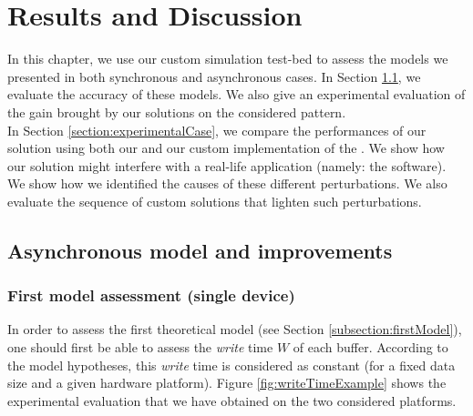 


\chapter{Results and Discussion}\label{chapter:results}
	In this chapter, we use our custom simulation test-bed to assess the models we presented in both synchronous and asynchronous cases.   In Section \ref{section:asynchronousModel}, we evaluate the accuracy of these models.   We also give an experimental evaluation of the gain brought by our solutions on the considered pattern.\\
	In Section \ref{section:experimentalCase}, we compare the performances of our \notationaio\space solution using both our \toolSimulationSoftware\space and our custom implementation of the \toolTargetSoftware.   We show how our solution might interfere with a real-life application (namely: the \toolTargetSoftware software).   We show how we identified the causes of these different perturbations.   We also evaluate the sequence of custom solutions that lighten such perturbations.\\


\section{Asynchronous model and improvements} \label{section:asynchronousModel}
	\subsection{First model assessment (single \notationIO\space device)}\label{subsection:AIO_firstApproachAssessment}
		In order to assess the first theoretical model (see Section \ref{subsection:firstModel}), one should first be able to assess the \emph{write} time $W$ of each buffer.   According to the model hypotheses, this \emph{write} time is considered as constant (for a fixed data size and a given hardware platform).   Figure \ref{fig:writeTimeExample} shows the experimental evaluation that we have obtained on the two considered platforms.\\

